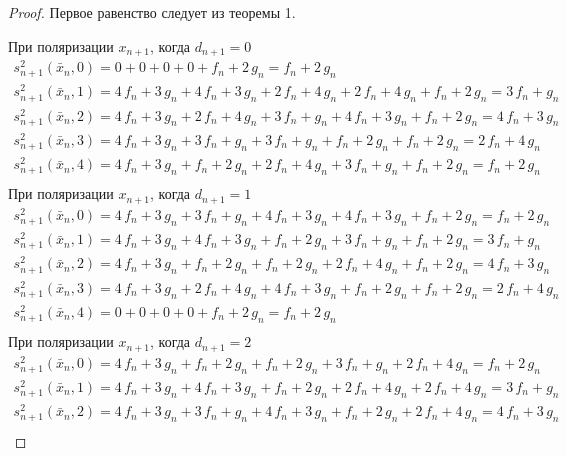 \documentclass[bibliography=totoc, a4paper, 14pt]{extarticle}
\begin{document}
 \begin{proof}

Первое равенство следует из теоремы 1.

При поляризации $x_{n+1}$, когда $d_{n+1} = 0$
$$\begin{array}{l}
s_{n+1}^2(\bar{x}_n, 0) = 0 + 0 + 0 + 0 + f_n + 2\,g_n = f_n + 2\,g_n \\
s_{n+1}^2(\bar{x}_n, 1) = 4\,f_n + 3\,g_n + 4\,f_n + 3\,g_n + 2\,f_n + 4\,g_n + 2\,f_n + 4\,g_n + f_n + 2\,g_n = 3\,f_n + g_n \\
s_{n+1}^2(\bar{x}_n, 2) = 4\,f_n + 3\,g_n + 2\,f_n + 4\,g_n + 3\,f_n + g_n + 4\,f_n + 3\,g_n + f_n + 2\,g_n = 4\,f_n + 3\,g_n \\
s_{n+1}^2(\bar{x}_n, 3) = 4\,f_n + 3\,g_n + 3\,f_n + g_n + 3\,f_n + g_n + f_n + 2\,g_n + f_n + 2\,g_n = 2\,f_n + 4\,g_n \\
s_{n+1}^2(\bar{x}_n, 4) = 4\,f_n + 3\,g_n + f_n + 2\,g_n + 2\,f_n + 4\,g_n + 3\,f_n + g_n + f_n + 2\,g_n = f_n + 2\,g_n \\
\end{array}$$
При поляризации $x_{n+1}$, когда $d_{n+1} = 1$
$$\begin{array}{l}
s_{n+1}^2(\bar{x}_n, 0) = 4\,f_n + 3\,g_n + 3\,f_n + g_n + 4\,f_n + 3\,g_n + 4\,f_n + 3\,g_n + f_n + 2\,g_n = f_n + 2\,g_n \\
s_{n+1}^2(\bar{x}_n, 1) = 4\,f_n + 3\,g_n + 4\,f_n + 3\,g_n + f_n + 2\,g_n + 3\,f_n + g_n + f_n + 2\,g_n = 3\,f_n + g_n \\
s_{n+1}^2(\bar{x}_n, 2) = 4\,f_n + 3\,g_n + f_n + 2\,g_n + f_n + 2\,g_n + 2\,f_n + 4\,g_n + f_n + 2\,g_n = 4\,f_n + 3\,g_n \\
s_{n+1}^2(\bar{x}_n, 3) = 4\,f_n + 3\,g_n + 2\,f_n + 4\,g_n + 4\,f_n + 3\,g_n + f_n + 2\,g_n + f_n + 2\,g_n = 2\,f_n + 4\,g_n \\
s_{n+1}^2(\bar{x}_n, 4) = 0 + 0 + 0 + 0 + f_n + 2\,g_n = f_n + 2\,g_n \\
\end{array}$$
При поляризации $x_{n+1}$, когда $d_{n+1} = 2$
$$\begin{array}{l}
s_{n+1}^2(\bar{x}_n, 0) = 4\,f_n + 3\,g_n + f_n + 2\,g_n + f_n + 2\,g_n + 3\,f_n + g_n + 2\,f_n + 4\,g_n = f_n + 2\,g_n \\
s_{n+1}^2(\bar{x}_n, 1) = 4\,f_n + 3\,g_n + 4\,f_n + 3\,g_n + f_n + 2\,g_n + 2\,f_n + 4\,g_n + 2\,f_n + 4\,g_n = 3\,f_n + g_n \\
s_{n+1}^2(\bar{x}_n, 2) = 4\,f_n + 3\,g_n + 3\,f_n + g_n + 4\,f_n + 3\,g_n + f_n + 2\,g_n + 2\,f_n + 4\,g_n = 4\,f_n + 3\,g_n \\

\end{array}$$
\end{proof}
\end{document}
